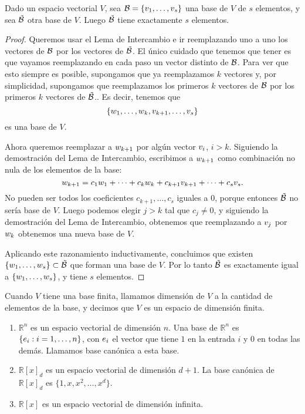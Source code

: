 \begin{prop}
Dado un espacio vectorial $V$, sea $\B = \{\vb_1, \dots, \vb_s\}$ una base de $V$ de $s$ elementos, y sea $\tilde{\mathcal B}$ otra base de $V$. Luego $\tilde{\mathcal B}$ tiene exactamente $s$ elementos.
\end{prop}
\begin{proof}
Queremos usar el Lema de Intercambio e ir reemplazando uno a uno los vectores de $\mathcal B$ por los vectores de $\tilde{\mathcal B}$. El \'unico cuidado que tenemos que tener es que vayamos reemplazando en cada paso un vector distinto de $\mathcal B$.
Para ver que esto siempre es posible, supongamos que ya reemplazamos $k$ vectores y, por simplicidad, supongamos que reemplazamos los primeros $k$ vectores de $\mathcal B$ por los primeros $k$ vectores de $\tilde{\mathcal B}$.. Es decir, tenemos que
$$
\{\wb_1, \dots, \wb_k, \vb_{k+1}, \dots, \vb_s\}
$$
es una base de $V$.

Ahora queremos reemplazar a $\wb_{k+1}$ por alg\'un vector $\vb_i$, $i > k$. Siguiendo la demostración del Lema de Intercambio, escribimos a $\wb_{k+1}$ como combinaci\'on no nula de los elementos de la base:
$$ \wb_{k+1} = c_1 \wb_1 + \dots + c_k \wb_k + c_{k+1} \vb_{k+1} + \dots + c_s \vb_s.$$
No pueden ser todos los coeficientes $c_{k+1}, \dots, c_s$ iguales a 0, porque entonces $\tilde{\mathcal B}$ no sería base de $V$. Luego podemos elegir $j > k$ tal que $c_j \neq 0$, y siguiendo la demostraci\'on del Lema de Intercambio, obtenemos que reemplazando a $\vb_j$ por $\wb_k$ obtenemos una nueva base de $V$.

Aplicando este razonamiento inductivamente, concluimos que existen $\{\wb_1, \dots, \wb_s\} \subset \tilde\B$ que forman una base de $V$. Por lo tanto $\tilde{\mathcal B}$ es exactamente igual a $\{\wb_1, \dots, \wb_s\}$, y tiene $s$ elementos.
\end{proof}

Cuando $V$ tiene una base finita, llamamos dimensión de $V$ a la cantidad de elementos de la base, y decimos que $V$ es un espacio de dimensión finita.

\begin{ejemplo}\leavevmode
\begin{enumerate}
\item $\mathbb{R}^n$ es un espacio vectorial de dimensión $n$. Una base de $\mathbb{R}^n$ es $\{\eb_i: i = 1, \dots, n\}$, con $\eb_i$ el vector que tiene $1$ en la entrada $i$ y $0$ en todas las demás. Llamamos base canónica a esta base.
\item $\mathbb{R}[x]_d$ es un espacio vectorial de dimensión $d+1$. La base canónica de $\mathbb{R}[x]_d$ es $\{1, x, x^2, \dots, x^d\}$.
\item $\mathbb{R}[x]$ es un espacio vectorial de dimensión infinita.
\end{enumerate}
\end{ejemplo}

